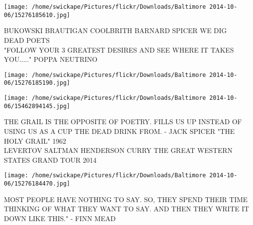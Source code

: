 \documentclass[10pt,letterpaper]{article}
\begin{document}
\vspace{0.25in}
\texttt{[image: /home/swickape/Pictures/flickr/Downloads/Baltimore 2014-10-06/15276185610.jpg]}

BUKOWSKI BRAUTIGAN COOLBRITH BARNARD SPICER WE DIG DEAD POETS\\
"FOLLOW YOUR 3 GREATEST DESIRES AND SEE WHERE IT TAKES YOU....." POPPA NEUTRINO
\pagebreak

\texttt{[image: /home/swickape/Pictures/flickr/Downloads/Baltimore 2014-10-06/15276185190.jpg]}

\vspace{0.25in}
\texttt{[image: /home/swickape/Pictures/flickr/Downloads/Baltimore 2014-10-06/15462894145.jpg]}

THE GRAIL IS THE OPPOSITE OF POETRY.  FILLS US UP INSTEAD OF USING US AS A CUP THE DEAD DRINK FROM.  {-} JACK SPICER "THE HOLY GRAIL" 1962\\
LEVERTOV SALTMAN HENDERSON CURRY THE GREAT WESTERN STATES GRAND TOUR 2014
\pagebreak

\texttt{[image: /home/swickape/Pictures/flickr/Downloads/Baltimore 2014-10-06/15276184470.jpg]}

MOST PEOPLE HAVE NOTHING TO SAY.  SO, THEY SPEND THEIR TIME THINKING OF WHAT THEY WANT TO SAY.  AND THEN THEY WRITE IT DOWN LIKE THIS." {-} FINN MEAD
\pagebreak
\end{document}

